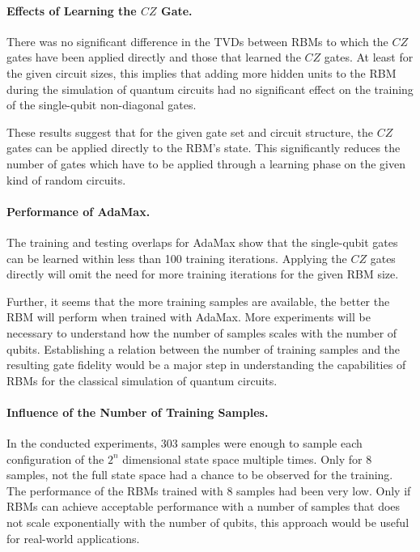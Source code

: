 \paragraph{Effects of Learning the $CZ$ Gate.}
There was no significant difference in the TVDs between RBMs to which the $CZ$ gates have 
been applied directly and those that learned the $CZ$ gates. At least for the given circuit 
sizes, this implies that adding more hidden units to the RBM during the simulation of 
quantum circuits had no significant effect on the training of the single-qubit non-diagonal 
gates. 

These results suggest that for the given gate set and circuit structure, the $CZ$ gates can 
be applied directly to the RBM's state. This significantly reduces the number of gates which 
have to be applied through a learning phase on the given kind of random circuits.

\paragraph{Performance of AdaMax.}
The training and testing overlaps for AdaMax show that the single-qubit gates can 
be learned within less than 100 training iterations. Applying 
the $CZ$ gates directly will omit the need for more training iterations for the given RBM size.

Further, it seems that the more training samples are available, the better the RBM will 
perform when trained with AdaMax. More experiments will be necessary 
to understand how the number of samples scales with the number of qubits. Establishing
a relation between the number of training samples and the resulting gate fidelity would 
be a major step in understanding the capabilities of RBMs for the classical simulation of 
quantum circuits.

\paragraph{Influence of the Number of Training Samples.}
In the conducted experiments, 303 samples were enough to sample each configuration of the 
$2^n$ dimensional state space multiple times. Only for 8  samples, not the full state space
had a chance to be observed for the training. The performance of the RBMs trained with 8 samples
had been very low. Only if RBMs can achieve acceptable performance with a number of samples 
that does not scale exponentially with the number of qubits, this approach would be useful for 
real-world applications. 


